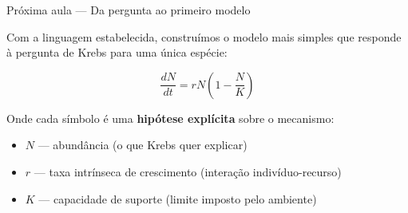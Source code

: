\documentclass[12pt]{beamer}
\begin{document}
\begin{frame}{Próxima aula — Da pergunta ao primeiro modelo}

  Com a linguagem estabelecida, construímos o modelo mais simples
  que responde à pergunta de Krebs para uma única espécie:

  \[
    \frac{dN}{dt} = rN\!\left(1 - \frac{N}{K}\right)
  \]

  Onde cada símbolo é uma \textbf{hipótese explícita} sobre o mecanismo:

  \bigskip
  \begin{itemize}
    \item $N$ --- abundância (o que Krebs quer explicar)
    \item $r$ --- taxa intrínseca de crescimento (interação indivíduo-recurso)
    \item $K$ --- capacidade de suporte (limite imposto pelo ambiente)
  \end{itemize}

\end{frame}
\end{document}
